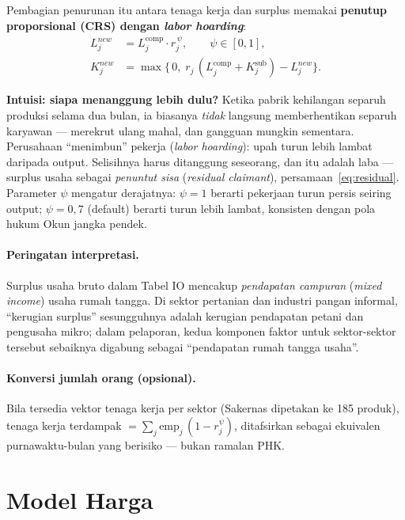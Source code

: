 \documentclass[11pt,a4paper]{article}
\newcommand{\en}[1]{\textit{#1}}   %
\begin{document}
Pembagian penurunan itu antara tenaga kerja dan surplus memakai
\textbf{penutup proporsional (CRS) dengan \en{labor hoarding}}:
\begin{align}
L^{new}_j &= L^{\text{comp}}_j \cdot r_j^{\,\psi},
\qquad \psi \in [0,1],
\label{eq:hoarding}\\
K^{new}_j &= \max\bigl\{\,0,\;
r_j\,(L^{\text{comp}}_j + K^{\text{sub}}_j) - L^{new}_j \bigr\}.
\label{eq:residual}
\end{align}

\begin{intuisi}
\textbf{Intuisi: siapa menanggung lebih dulu?} Ketika pabrik kehilangan
separuh produksi selama dua bulan, ia biasanya \emph{tidak} langsung
memberhentikan separuh karyawan --- merekrut ulang mahal, dan gangguan
mungkin sementara. Perusahaan ``menimbun'' pekerja (\en{labor hoarding}):
upah turun lebih lambat daripada output. Selisihnya harus ditanggung
seseorang, dan itu adalah laba --- surplus usaha sebagai \emph{penuntut
sisa} (\en{residual claimant}), persamaan~\eqref{eq:residual}.
Parameter $\psi$ mengatur derajatnya: $\psi = 1$ berarti pekerjaan turun
persis seiring output; $\psi = 0{,}7$ (default) berarti turun lebih
lambat, konsisten dengan pola hukum Okun jangka pendek.
\end{intuisi}

\paragraph{Peringatan interpretasi.} Surplus usaha bruto dalam Tabel IO
mencakup \emph{pendapatan campuran} (\en{mixed income}) usaha rumah tangga.
Di sektor pertanian dan industri pangan informal, ``kerugian surplus''
sesungguhnya adalah kerugian pendapatan petani dan pengusaha mikro; dalam
pelaporan, kedua komponen faktor untuk sektor-sektor tersebut sebaiknya
digabung sebagai ``pendapatan rumah tangga usaha''.

\paragraph{Konversi jumlah orang (opsional).} Bila tersedia vektor tenaga
kerja per sektor (Sakernas dipetakan ke 185 produk), tenaga kerja terdampak
$= \sum_j \text{emp}_j \,(1 - r_j^{\psi})$, ditafsirkan sebagai ekuivalen
purnawaktu-bulan yang berisiko --- bukan ramalan PHK.

\section{Model Harga}
\label{sec:price}
\end{document}
